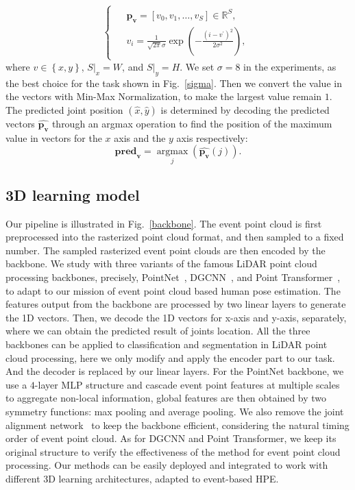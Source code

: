 \documentclass[10pt,twocolumn,letterpaper]{article}
\begin{document}
\begin{equation}\label{eq:8}
\left\{\begin{array}{c}
\begin{aligned}
&\boldsymbol{{p}_{v}} =\left[v_{0}, v_{1}, \ldots, v_{S}\right] \in \mathbb{R}^{S},\\
&v_{i} = \frac{1}{\sqrt{2 \pi} \sigma} \exp \left(-\frac{\left(i-v^{\prime}\right)^{2}}{2 \sigma^{2}}\right), 
\end{aligned}
\end{array}\right.
\end{equation}
where $v \in \left\{x, y\right\}$, $S \vert _{x} = W$, and $S \vert _{y} = H$.
We set $\sigma=8$ in the experiments, as the best choice for the task shown in Fig.~\ref{sigma}. 
Then we convert the value in the vectors with Min-Max Normalization, to make the largest value remain $1$. The predicted joint position $(\hat{x}, \hat{y})$ is determined by decoding the predicted vectors $\boldsymbol{\hat{p_{v}}}$ through an argmax operation to find the position of the maximum value in vectors for the $x$ axis and the $y$ axis respectively:
\begin{equation}
\boldsymbol{{pred}_{v}} =\mathop{\arg\max}\limits_{j}\left(\boldsymbol{\hat{p_{v}}}(j)\right).
\end{equation}

\subsection{3D learning model}
Our pipeline is illustrated in Fig.~\ref{backbone}.
The event point cloud is first preprocessed into the rasterized point cloud format, and then sampled to a fixed number.
The sampled rasterized event point clouds are then encoded by the backbone.
We study with three variants of the famous LiDAR point cloud processing backbones, precisely, PointNet~\cite{qi2017pointnet}, DGCNN~\cite{wang2019dgcnn}, and Point Transformer~\cite{zhao2021pointtrans}, to adapt to our mission of event point cloud based human pose estimation.
The features output from the backbone are processed by two linear layers to generate the 1D vectors.
Then, we decode the 1D vectors for x-axis and y-axis, separately, where we can obtain the predicted result of joints location.
All the three backbones can be applied to classification and segmentation in LiDAR point cloud processing, here we only modify and apply the encoder part to our task.
And the decoder is replaced by our linear layers.
For the PointNet backbone, we use a $4$-layer MLP structure and cascade event point features at multiple scales to aggregate non-local information, global features are then obtained by two symmetry functions: max pooling and average pooling. We also remove the joint alignment network~\cite{qi2017pointnet} to keep the backbone efficient, considering the natural timing order of event point cloud. As for DGCNN and Point Transformer, we keep its original structure to verify the effectiveness of the method for event point cloud processing.
Our methods can be easily deployed and integrated to work with different 3D learning architectures, adapted to event-based HPE.
\end{document}
